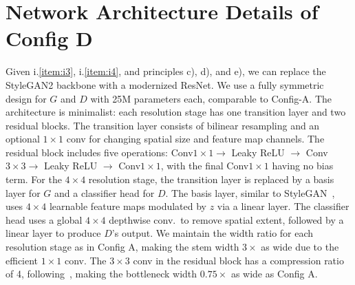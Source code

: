 \section{Network Architecture Details of Config D}
\vspace{-0.5ex}
Given i.\ref{item:i3}, i.\ref{item:i4}, and principles c), d), and e), we can replace the StyleGAN2 backbone with a modernized ResNet. We use a fully symmetric design for $G$ and $D$ with 25M parameters each, comparable to Config-A. The architecture is minimalist: each resolution stage has one transition layer and two residual blocks. The transition layer consists of bilinear resampling and an optional $1\times1$ conv for changing spatial size and feature map channels. The residual block includes five operations: Conv$1\times1\rightarrow$ Leaky ReLU $\rightarrow$ Conv$3\times3\rightarrow$ Leaky ReLU $\rightarrow$ Conv$1\times1$, with the final Conv$1\times1$ having no bias term. For the $4\times4$ resolution stage, the transition layer is replaced by a basis layer for $G$ and a classifier head for $D$. The basis layer, similar to StyleGAN~\cite{sg1,sg2}, uses $4\times4$ learnable feature maps modulated by $z$ via a linear layer. The classifier head uses a global $4\times4$ depthwise conv.~to remove spatial extent, followed by a linear layer to produce $D$'s output. We maintain the width ratio for each resolution stage as in Config A, making the stem width $3\times$ as wide due to the efficient $1\times1$ conv. The $3\times3$ conv in the residual block has a compression ratio of 4, following~\cite{resnet,resnet2}, making the bottleneck width $0.75\times$ as wide as Config A.

